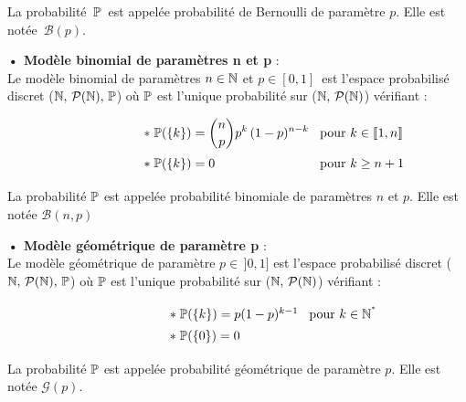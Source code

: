 \noindent La probabilité \(\,\mathbb{P}\,\) est appelée probabilité de Bernoulli de paramètre $p$. Elle est notée \(\,\mathcal{B}(p)\).


\vspace{0.9cm}

\textbf{• Modèle binomial de paramètres n et p} :\vspace{0.2cm}\\
Le modèle binomial de paramètres \(n\in \mathbb{N}\) et \(p\in [0,1]\,\) est l'espace probabilisé discret (\(\mathbb{N},\,\mathcal{P}(\mathbb{N}),\,\mathbb{P}\)) où \(\mathbb{P}\) est l'unique probabilité sur (\(\mathbb{N},\,\mathcal{P}(\mathbb{N})\)) vérifiant :\vspace{-0.1cm}

\[\displaystyle \hspace{2cm} \def\arraystretch{1.4} \arraycolsep=0.15cm
\begin{array}{ll}
    \ast \; \PP(\{k\})=\displaystyle{\binom{n}{p}p^k\,(1-p)^{n-k}} & \text{pour } k\in \llbracket 1,n \rrbracket \vspace{0.1cm}\\
    \ast \; \PP(\{k\})=0 & \text{pour } k\geq n+1 
\end{array}\]

\vspace{0.3cm}

\noindent La probabilité \(\mathbb{P}\) est appelée probabilité binomiale de paramètres $n$ et $p$. Elle est notée \(\mathcal{B}(n,p)\)

\vspace{0.9cm}

\textbf{• Modèle géométrique de paramètre p} :\vspace{0.2cm}\\
Le modèle géométrique de paramètre \(p\in\, ]0,1]\) est l'espace probabilisé discret (\(\mathbb{N},\,\mathcal{P}(\mathbb{N}),\,\mathbb{P}\)) où \(\mathbb{P}\) est l'unique probabilité sur (\(\mathbb{N},\,\mathcal{P}(\mathbb{N})\)) vérifiant :\vspace{-0.3cm}

\[ \hspace{2cm} \def\arraystretch{1.4} \arraycolsep=0.15cm
\begin{array}{ll}
    \ast \; \PP(\{k\})=p(1-p)^{k-1} & \text{pour } k\in \NN^{^*}\\
    \ast \; \PP(\{0\})=0 & 
\end{array}\]

\vspace{0.2cm}

\noindent La probabilité \(\mathbb{P}\) est appelée probabilité géométrique de paramètre $p$. Elle est notée \(\mathcal{G}(p)\).

